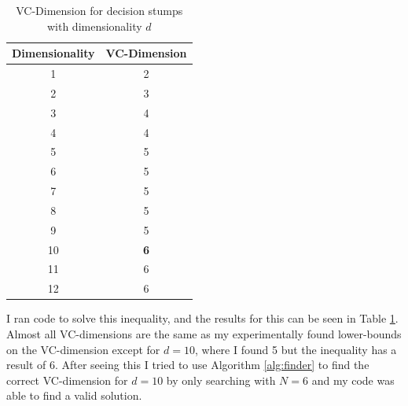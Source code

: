 \documentclass[11pt,a4paper]{article}
\begin{document}
\begin{table}
    \centering
    \begin{tabular}{|c|c|}
    \hline
    Dimensionality & VC-Dimension \\ \hline
    1              & 2                        \\ \hline
    2              & 3                           \\ \hline
    3              & 4                         \\ \hline
    4              & 4                            \\ \hline
    5              & 5                            \\ \hline
    6              &    5                         \\ \hline
    7              & 5                           \\ \hline
    8              & 5                            \\ \hline
    9              & 5                            \\ \hline
    10              & \textbf{6}                            \\ \hline
    11             &  6                          \\ \hline
    12              &  6                           \\ \hline
    \end{tabular}
    \caption{VC-Dimension for decision stumps with dimensionality $d$}
    \label{tab:vc-dimension}
\end{table}

I ran code to solve this inequality, and the results for this can be seen in Table \ref{tab:vc-dimension}. Almost all VC-dimensions are the same as my experimentally found lower-bounds on the VC-dimension except for $d=10$, where I found 5 but the inequality has a result of 6. After seeing this I tried to use Algorithm \ref{alg:finder} to find the correct VC-dimension for $d=10$ by only searching with $N=6$ and my code was able to find a valid solution.




\end{document}
